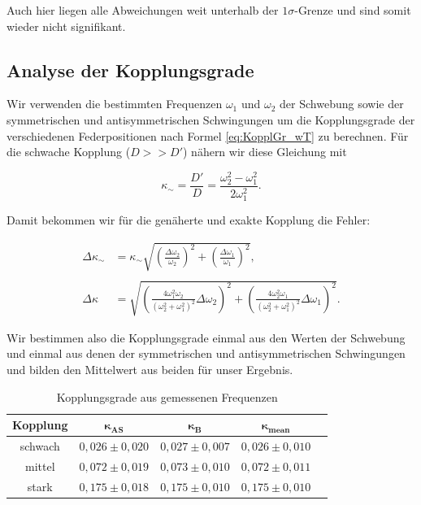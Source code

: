 \documentclass{article}
\begin{document}
\phantom{.}

Auch hier liegen alle Abweichungen weit unterhalb der $1\sigma$-Grenze und sind somit wieder nicht signifikant.

\newpage
\subsection{Analyse der Kopplungsgrade}

Wir verwenden die bestimmten Frequenzen $\omega_1$ und $\omega_2$ der Schwebung sowie der symmetrischen und antisymmetrischen Schwingungen um die Kopplungsgrade der verschiedenen Federpositionen nach Formel \ref{eq:KopplGr_wT} zu berechnen. Für die schwache Kopplung ($D >> D'$) nähern wir diese Gleichung mit

\begin{equation}
    \kappa_{\sim} = \frac{D'}{D} = \frac{\omega^2_2 - \omega^2_1}{2\omega^2_1}.
\end{equation}

Damit bekommen wir für die genäherte und exakte Kopplung die Fehler:

\begin{equation}
    \begin{split}
        \Delta \kappa_{\sim} &= \kappa_{\sim} \sqrt{\left( \frac{\Delta \omega_2}{\omega_2} \right)^2 + \left( \frac{\Delta \omega_1}{\omega_1} \right)^2}, \\ \\
        \Delta \kappa &= \sqrt{\left( \frac{4 \omega^2_1 \omega_2}{(\omega^2_2 + \omega^2_1)^2} \Delta \omega_2 \right)^2 + \left( \frac{4 \omega^2_2 \omega_1}{(\omega^2_2 + \omega^2_1)^2} \Delta \omega_1 \right)^2}.
    \end{split}
\end{equation}

Wir bestimmen also die Kopplungsgrade einmal aus den Werten der Schwebung und einmal aus denen der symmetrischen und antisymmetrischen Schwingungen und bilden den Mittelwert aus beiden für unser Ergebnis.

\phantom{.}

\begin{table}[!h]
    \centering
    \begin{tabular}{ccccc}
        \hline
        \textbf{Kopplung} & $\bm{\kappa_{AS}}$ & $\bm{\kappa_{B}}$ & $\bm{\kappa_{mean}}$  \\ \hline
        schwach & $0,026 \pm 0,020$       & $0,027 \pm 0,007$ & $0,026 \pm 0,010$  \\
        mittel & $0,072 \pm 0,019$        & $0,073 \pm 0,010$ & $0,072 \pm 0,011$  \\
        stark & $0,175 \pm 0,018$         & $0,175 \pm 0,010$ & $0,175 \pm 0,010$  \\ \hline
    \end{tabular}%
    \caption{Kopplungsgrade aus gemessenen Frequenzen}
    \label{tab:kopplungsgrade_ws}
\end{table}
\end{document}
